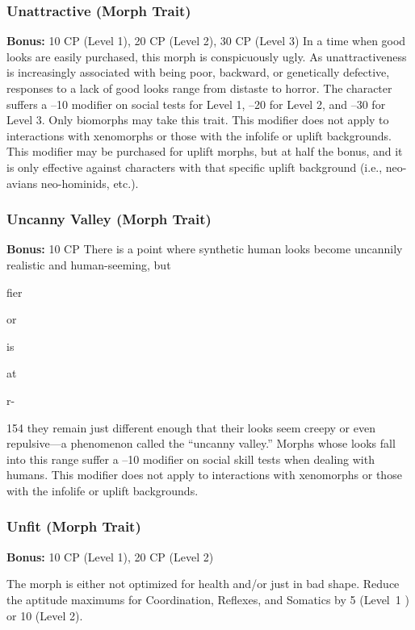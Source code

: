 \subsubsection{Unattractive (Morph Trait)}

\textbf{Bonus:} 10 CP (Level 1), 20 CP (Level 2), 30 CP (Level 3)
In a time when good looks are easily purchased, 
this morph is conspicuously ugly. As unattractiveness 
is increasingly associated with being poor, backward, 
or genetically defective, responses to a lack of good 
looks range from distaste to horror. The character suffers
a –10 modifier on social tests for Level 1, –20 for
Level 2, and –30 for Level 3.
Only biomorphs may take this trait. This modifier 
does not apply to interactions with xenomorphs or 
those with the infolife or uplift backgrounds. This 
modifier may be purchased for uplift morphs, but at 
half the bonus, and it is only effective against characters
with that specific uplift background (i.e., neo-avians
neo-hominids, etc.).

\subsubsection{Uncanny Valley (Morph Trait)}

\textbf{Bonus:} 10 CP
There is a point where synthetic human looks 
become uncannily realistic and human-seeming, but 

fier 

or 

is

at 

r-


154
they remain just different enough that their looks 
seem creepy or even repulsive—a phenomenon called 
the ``uncanny valley.'' Morphs whose looks fall into 
this range suffer a –10 modifier on social skill tests 
when dealing with humans. This modifier does not 
apply to interactions with xenomorphs or those with 
the infolife or uplift backgrounds. 

\subsubsection{Unfit (Morph Trait)}

\textbf{Bonus:} 10 CP (Level 1), 20 CP (Level 2)

The morph is either not optimized for health and/or 
just in bad shape. Reduce the aptitude maximums for 
Coordination, Reflexes, and Somatics by 5 (Level 1 ) 
or 10 (Level 2).

